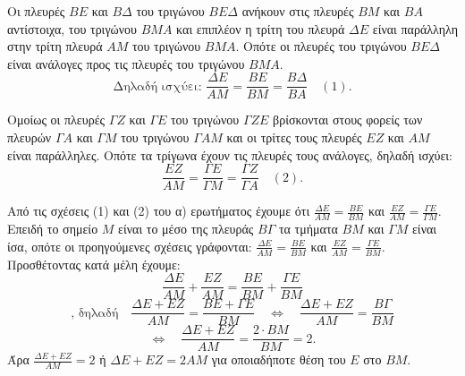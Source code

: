 \begin{alist}
    \item \begin{rlist}
        \item Οι πλευρές $BE$ και $B\Delta$ του τριγώνου $B E \Delta$ ανήκουν στις πλευρές $BM$ και $BA$ αντίστοιχα, του τριγώνου $BMA$ και επιπλέον η τρίτη του πλευρά $\Delta E$ είναι παράλληλη στην τρίτη πλευρά $AM$ του τριγώνου $BMA$. Οπότε οι πλευρές του τριγώνου $B E \Delta$ είναι ανάλογες προς τις πλευρές του τριγώνου $BMA$.
        \[ \text{Δηλαδή ισχύει: } \frac{\Delta E}{AM} = \frac{BE}{BM} = \frac{B\Delta}{BA} \quad (1). \]
        \item Ομοίως οι πλευρές $\Gamma Z$ και $\Gamma E$ του τριγώνου $\Gamma Z E$ βρίσκονται στους φορείς των πλευρών $\Gamma A$ και $\Gamma M$ του τριγώνου $\Gamma A M$ και οι τρίτες τους πλευρές $EZ$ και $AM$ είναι παράλληλες. Οπότε τα τρίγωνα έχουν τις πλευρές τους ανάλογες, δηλαδή ισχύει:
        \[ \frac{EZ}{AM} = \frac{\Gamma E}{\Gamma M} = \frac{\Gamma Z}{\Gamma A} \quad (2). \]
    \end{rlist}
    \item Από τις σχέσεις (1) και (2) του α) ερωτήματος έχουμε ότι $\frac{\Delta E}{AM} = \frac{BE}{BM}$ και $\frac{EZ}{AM} = \frac{\Gamma E}{\Gamma M}$. Επειδή το σημείο $M$ είναι το μέσο της πλευράς $B\Gamma$ τα τμήματα $BM$ και $\Gamma M$ είναι ίσα, οπότε οι προηγούμενες σχέσεις γράφονται: $\frac{\Delta E}{AM} = \frac{BE}{BM}$ και $\frac{EZ}{AM} = \frac{\Gamma E}{BM}$. Προσθέτοντας κατά μέλη έχουμε:
    \[ \frac{\Delta E}{AM} + \frac{EZ}{AM} = \frac{BE}{BM} + \frac{\Gamma E}{BM} \]
    \[ \text{, δηλαδή} \quad \frac{\Delta E+EZ}{AM} = \frac{BE+\Gamma E}{BM} \quad \Leftrightarrow \quad \frac{\Delta E+EZ}{AM} = \frac{B\Gamma}{BM} \]
    \[ \Leftrightarrow \quad \frac{\Delta E+EZ}{AM} = \frac{2 \cdot BM}{BM} = 2. \]
    Άρα $\frac{\Delta E+EZ}{AM} = 2$ ή $\Delta E+EZ=2AM$ για οποιαδήποτε θέση του $E$ στο $BM$.
\end{alist}